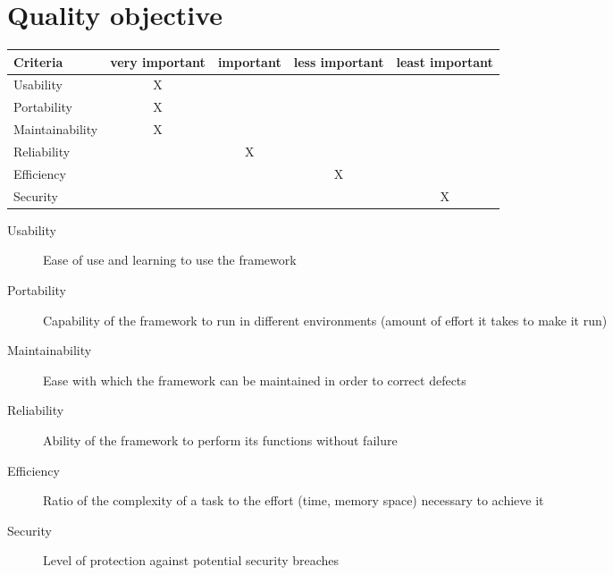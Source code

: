 \section{Quality objective}

\begin{tabular}{lcccc}
\hline
{\bf Criteria} & {\bf very important} & {\bf important} & {\bf less important} & {\bf least important} \\
\hline
Usability & X & & & \\
Portability & X & & & \\
Maintainability & X & & & \\
Reliability & & X & & \\
Efficiency & & & X & \\
Security & & & & X \\
\hline

\end{tabular}


\begin{description}
	\item[Usability] Ease of use and learning to use the framework
	\item[Portability] Capability of the framework to run in different environments (amount of effort it takes to make it run)
	\item[Maintainability] Ease with which the framework can be maintained in order to correct defects
	\item[Reliability] Ability of the framework to perform its functions without failure
	\item[Efficiency] Ratio of the complexity of a task to the effort (time, memory space) necessary to achieve it
	\item[Security] Level of protection against potential security breaches
\end{description}